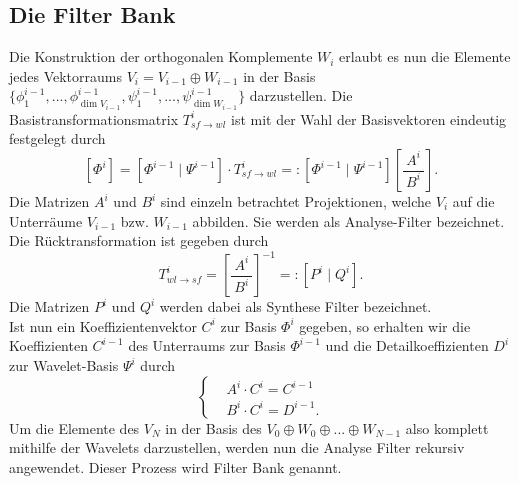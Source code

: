 \subsection{Die Filter Bank}
Die Konstruktion der orthogonalen Komplemente $W_i$ erlaubt es nun die Elemente jedes Vektorraums $V_i=V_{i-1}\oplus W_{i-1}$ in der Basis $\{\phi^{i-1}_1, ..., \phi^{i-1}_{\dim V_{i-1}}, \psi^{i-1}_1, ..., \psi^{i-1}_{\dim W_{i-1}}\}$ darzustellen. Die Basistransformationsmatrix $T^i_{sf\rightarrow wl}$ ist mit der Wahl der Basisvektoren eindeutig festgelegt durch\begin{equation*}
\left[ \Phi^i\right] =\left[ \Phi^{i-1}\mid \Psi^{i-1}\right] \cdot T^i_{sf\rightarrow wl}=:\left[ \Phi^{i-1}\mid \Psi^{i-1}\right]\left[ \frac{\ A^i\ }{\ B^i\ }\right].
\end{equation*}Die Matrizen $A^i$ und $B^i$ sind einzeln betrachtet Projektionen, welche $V_i$ auf die Unterräume $V_{i-1}$ bzw. $W_{i-1}$ abbilden. Sie werden als Analyse-Filter bezeichnet. Die Rücktransformation ist gegeben durch\begin{equation*}
T^i_{wl\rightarrow sf}=\left[ \frac{\ A^i\ }{\ B^i\ }\right]^{-1}=:\left[ P^i\mid Q^i\right].
\end{equation*}Die Matrizen $P^i$ und $Q^i$ werden dabei als Synthese Filter bezeichnet.\\
Ist nun ein Koeffizientenvektor $C^i$ zur Basis $\Phi^i$ gegeben, so erhalten wir die Koeffizienten $C^{i-1}$ des Unterraums zur Basis $\Phi^{i-1}$ und die Detailkoeffizienten $D^i$ zur Wavelet-Basis $\Psi^i$ durch\begin{equation*}
	\begin{cases}
	&A^i\cdot C^i=C^{i-1}\\
	&B^i\cdot C^i=D^{i-1}.
	\end{cases}
\end{equation*}
Um die Elemente des $V_N$ in der Basis des $V_0\oplus W_0 \oplus...\oplus W_{N-1}$ also komplett mithilfe der Wavelets darzustellen, werden nun die Analyse Filter rekursiv angewendet. Dieser Prozess wird Filter Bank genannt.
